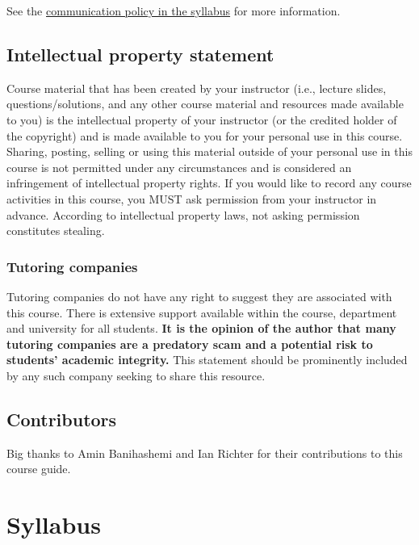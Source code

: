 \documentclass[
  openany]{book}
\begin{document}
See the \protect\hyperlink{communication-policy}{communication policy in the syllabus} for more information.

\hypertarget{intellectual-property-statement}{%
\section{Intellectual property statement}\label{intellectual-property-statement}}

Course material that has been created by your instructor (i.e., lecture slides, questions/solutions, and any other course material and resources made available to you) is the intellectual property of your instructor (or the credited holder of the copyright) and is made available to you for your personal use in this course. Sharing, posting, selling or using this material outside of your personal use in this course is not permitted under any circumstances and is considered an infringement of intellectual property rights. If you would like to record any course activities in this course, you MUST ask permission from your instructor in advance. According to intellectual property laws, not asking permission constitutes stealing.

\hypertarget{tutoring-companies}{%
\subsection{Tutoring companies}\label{tutoring-companies}}

Tutoring companies do not have any right to suggest they are associated with this course. There is extensive support available within the course, department and university for all students. \textbf{It is the opinion of the author that many tutoring companies are a predatory scam and a potential risk to students' academic integrity.} This statement should be prominently included by any such company seeking to share this resource.

\hypertarget{contributors}{%
\section{Contributors}\label{contributors}}

Big thanks to Amin Banihashemi and Ian Richter for their contributions to this course guide.

\hypertarget{syllabus}{%
\chapter{Syllabus}\label{syllabus}}
\end{document}
